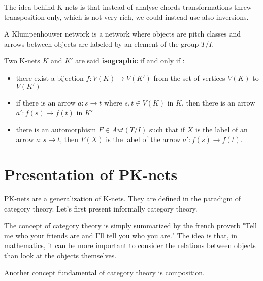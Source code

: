 \documentclass{report}
\begin{document}
The idea behind K-nets is that instead of analyse chords transformations threw transposition only, which is not very rich, we could instead use also inversions.

\begin{defn}
    A Klumpenhouwer network is a network where objects are pitch classes and arrows between objects are labeled by an element of the group $T/I$.
\end{defn}

\begin{defn}
    Two K-nets $K$ and $K'$ are said \textbf{isographic} if and only if :
    \begin{itemize}
        \item there exist a bijection $f:V(K)\rightarrow V(K')$ from the set of vertices $V(K)$ to $V(K')$
        \item if there is an arrow $a:s\rightarrow t$ where $s,t\in V(K)$ in $K$, then there is an arrow $a':f(s)\rightarrow f(t)$ in $K'$
        \item there is an automorphism $F \in Aut(T/I)$ such that if $X$ is the label of an arrow $a:s\rightarrow t$, then $F(X)$ is the label of the arrow $a':f(s)\rightarrow f(t)$.
    \end{itemize}
\end{defn}




\section{Presentation of PK-nets}

PK-nets\cite{PAAE2016} are a generalization of K-nets. They are defined in the paradigm of category theory. Let's first present informally category theory.

The concept of category theory is simply summarized by the french proverb "Tell me who your friends are and I'll tell you who you are." The idea is that, in mathematics, it can be more important to consider the relations between objects than look at the objects themselves.

Another concept fundamental of category theory is composition.
\end{document}
